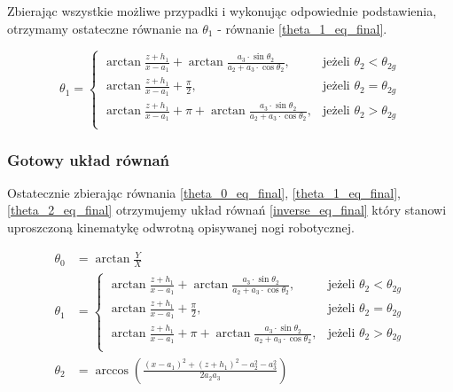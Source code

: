 Zbierając wszystkie możliwe przypadki i wykonując odpowiednie podstawienia, otrzymamy ostateczne równanie na $\theta_1$ - równanie \ref{theta_1_eq_final}.

\begin{equation} \label{theta_1_eq_final}
\theta_1 = \begin{cases}
    \arctan{\frac{z + h_1}{x - a_1}} + \arctan{\frac{a_3 \cdot \sin{\theta_2}}{a_2 + a_3 \cdot{\cos{\theta_2}}}},& \text{jeżeli } \theta_2 < \theta_{2g}\\
    \arctan{\frac{z + h_1}{x - a_1}} + \frac{\pi}{2}  ,& \text{jeżeli } \theta_2 = \theta_{2g}\\
    \arctan{\frac{z + h_1}{x - a_1}} + \pi + 
    \arctan{\frac{a_3 \cdot \sin{\theta_2}}{a_2 + a_3 \cdot{\cos{\theta_2}}}}  ,& \text{jeżeli } \theta_2 > \theta_{2g}\\
\end{cases}
\end{equation}

\subsubsection{Gotowy układ równań}

Ostatecznie zbierając równania \ref{theta_0_eq_final}, \ref{theta_1_eq_final}, \ref{theta_2_eq_final} otrzymujemy układ równań \ref{inverse_eq_final} który stanowi uproszczoną kinematykę odwrotną opisywanej nogi robotycznej.

\begin{equation}\label{inverse_eq_final}
\begin{split}
\theta_0 &= \arctan{\frac{Y}{X}}\\
\theta_1 &= \begin{cases}
    \arctan{\frac{z + h_1}{x - a_1}} + \arctan{\frac{a_3 \cdot \sin{\theta_2}}{a_2 + a_3 \cdot{\cos{\theta_2}}}},& \text{jeżeli } \theta_2 < \theta_{2g}\\
    \arctan{\frac{z + h_1}{x - a_1}} + \frac{\pi}{2}  ,& \text{jeżeli } \theta_2 = \theta_{2g}\\
    \arctan{\frac{z + h_1}{x - a_1}} + \pi + 
    \arctan{\frac{a_3 \cdot \sin{\theta_2}}{a_2 + a_3 \cdot{\cos{\theta_2}}}}  ,& \text{jeżeli } \theta_2 > \theta_{2g}\\
\end{cases}\\
\theta_2 &= \arccos{\left( \frac{(x - a_1)^2 + (z + h_1)^2 - a_2^2 - a_3^2}{2 a_2 a_3} \right)}\\
\end{split}
\end{equation}

